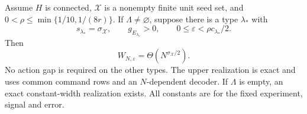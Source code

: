 \begin{theorem}
\label{thm:intrinsic-width41}
Assume $H$ is connected, $\mathcal X$ is a nonempty finite unit seed
set, and $0<\rho\le\min\{1/10,1/(8r)\}$. If
$\Lambda\ne\varnothing$, suppose there is a type $\lambda_*$ with
\begin{equation}\label{eq:dominant41}
 s_{\lambda_*}=\sigma_{\mathcal X},\qquad
 g_{E_{\lambda_*}}>0,\qquad
 0\le\varepsilon<\rho c_{\lambda_*}/2.
\end{equation}
Then
\begin{equation}\label{eq:intrinsic-width41}
 W_{N,\varepsilon}=\Theta(N^{\sigma_{\mathcal X}/2}).
\end{equation}
No action gap is required on the other types. The upper realization is
exact and uses common command rows and an $N$-dependent decoder. If
$\Lambda$ is empty, an exact constant-width realization exists.
All constants are for the fixed experiment, signal and error.
\end{theorem}

